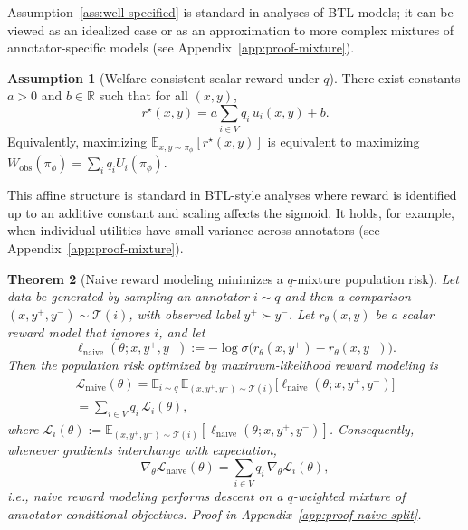 \documentclass{article}
\theoremstyle{plain}
\newtheorem{theorem}{Theorem}[section]
\theoremstyle{definition}
\newtheorem{assumption}[theorem]{Assumption}
\theoremstyle{remark}
\begin{document}
Assumption~\ref{ass:well-specified} is standard in analyses of BTL models; it
can be viewed as an idealized case or as an approximation to more complex
mixtures of annotator-specific models (see Appendix~\ref{app:proof-mixture}).

\begin{assumption}[Welfare-consistent scalar reward under $q$]
\label{ass:welfare-consistent}
There exist constants $a > 0$ and $b \in \mathbb{R}$ such that for all $(x,y)$,
\begin{equation}
    r^\star(x,y) = a \sum_{i \in V} q_i \, u_i(x,y) + b.
\end{equation}
Equivalently, maximizing $\mathbb{E}_{x,y \sim \pi_\phi}[r^\star(x,y)]$ is
equivalent to maximizing $W_{\text{obs}}(\pi_\phi) = \sum_i q_i U_i(\pi_\phi)$.
\end{assumption}

This affine structure is standard in BTL-style analyses where reward is
identified up to an additive constant and scaling affects the sigmoid. It
holds, for example, when individual utilities have small variance across
annotators (see Appendix~\ref{app:proof-mixture}).


\begin{theorem}[Naive reward modeling minimizes a $q$-mixture population risk]
\label{thm:naive-q-objective}
Let data be generated by sampling an annotator $i \sim q$ and then a comparison
$(x,y^+,y^-) \sim \mathcal{T}(i)$, with observed label $y^+ \succ y^-$.
Let $r_\theta(x,y)$ be a scalar reward model that ignores $i$, and let
\[
\ell_{\text{naive}}(\theta;x,y^+,y^-)
:=
- \log \sigma\!\big(r_\theta(x,y^+) - r_\theta(x,y^-)\big).
\]
Then the population risk optimized by maximum-likelihood reward modeling is
\begin{equation}
\begin{aligned}
\mathcal{L}_{\text{naive}}(\theta)
=
\mathbb{E}_{i\sim q}\,
\mathbb{E}_{(x,y^+,y^-)\sim\mathcal{T}(i)}
\big[\ell_{\text{naive}}(\theta;x,y^+,y^-)\big] \\
=
\sum_{i\in V} q_i \, \mathcal{L}_i(\theta), \qquad\qquad\qquad\qquad\qquad\qquad
\label{eq:naive-q-mixture-risk}
\end{aligned}
\end{equation}
where $\mathcal{L}_i(\theta):=\mathbb{E}_{(x,y^+,y^-)\sim\mathcal{T}(i)}[\ell_{\text{naive}}(\theta;x,y^+,y^-)]$.
Consequently, whenever gradients interchange with expectation,
\begin{equation}
\nabla_\theta \mathcal{L}_{\text{naive}}(\theta)
=
\sum_{i\in V} q_i\, \nabla_\theta \mathcal{L}_i(\theta),
\label{eq:naive-q-mixture-grad}
\end{equation}
i.e., naive reward modeling performs descent on a $q$-weighted mixture of
annotator-conditional objectives. Proof in Appendix~\ref{app:proof-naive-split}.
\end{theorem}
\end{document}
